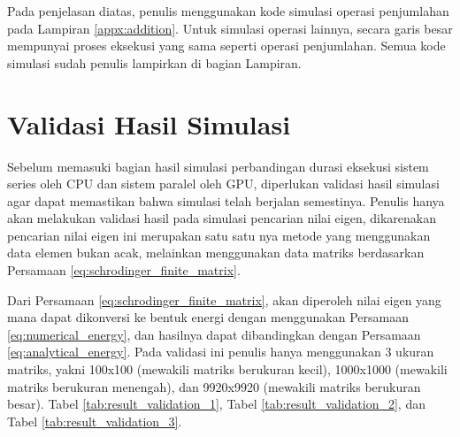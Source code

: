 Pada penjelasan diatas, penulis menggunakan kode simulasi operasi penjumlahan pada Lampiran \ref{appx:addition}. Untuk simulasi operasi lainnya, secara garis besar mempunyai proses eksekusi yang sama seperti operasi penjumlahan. Semua kode simulasi sudah penulis lampirkan di bagian Lampiran.

\section{Validasi Hasil Simulasi}

Sebelum memasuki bagian hasil simulasi perbandingan durasi eksekusi sistem series oleh CPU dan sistem paralel oleh GPU, diperlukan validasi hasil simulasi agar dapat memastikan bahwa simulasi telah berjalan semestinya. Penulis hanya akan melakukan validasi hasil pada simulasi pencarian nilai eigen, dikarenakan pencarian nilai eigen ini merupakan satu satu nya metode yang menggunakan data elemen bukan acak, melainkan menggunakan data matriks berdasarkan Persamaan \ref{eq:schrodinger_finite_matrix}.

Dari Persamaan \ref{eq:schrodinger_finite_matrix}, akan diperoleh nilai eigen yang mana dapat dikonversi ke bentuk energi dengan menggunakan Persamaan \ref{eq:numerical_energy}, dan hasilnya dapat dibandingkan dengan Persamaan \ref{eq:analytical_energy}. Pada validasi ini penulis hanya menggunakan 3 ukuran matriks, yakni 100x100 (mewakili matriks berukuran kecil), 1000x1000 (mewakili matriks berukuran menengah), dan 9920x9920 (mewakili matriks berukuran besar). Tabel \ref{tab:result_validation_1}, Tabel \ref{tab:result_validation_2}, dan Tabel \ref{tab:result_validation_3}.

